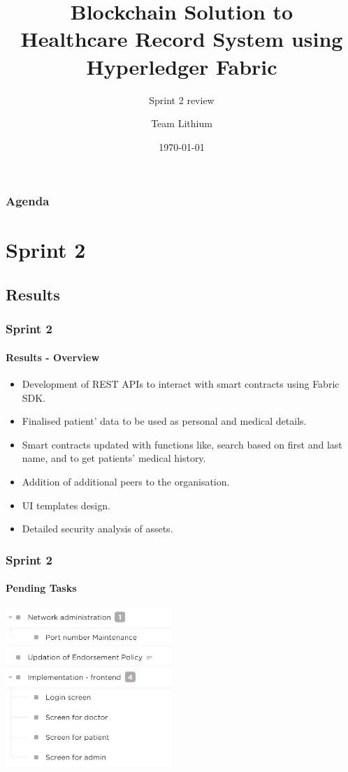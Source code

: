 \documentclass[english,hangout]{beamer}
\title{Blockchain Solution to\\Healthcare Record System using\\Hyperledger Fabric}
\subtitle{Sprint 2 review}
\author{Team Lithium}
\date{\today}%
\begin{document}
\begin{frame}
\titlepage
\end{frame}



\begin{frame}
   \frametitle{Agenda}
   \tableofcontents%
\end{frame}




\section{Sprint 2}

\subsection{Results}

\begin{frame}[fragile]
 \frametitle{Sprint 2}
 \framesubtitle{Results - Overview}
  \begin{itemize}
    \item Development of REST APIs to interact with smart contracts using Fabric SDK.
    \item Finalised patient' data to be used as personal and medical details.
    \item Smart contracts updated with functions like, search based on first and last name, and to get patients' medical history.
    \item Addition of additional peers to the organisation.
    \item UI templates design.
    \item Detailed security analysis of assets.
  \end{itemize}
\end{frame}

\begin{frame}[fragile]
 \frametitle{Sprint 2}
 \framesubtitle{Pending Tasks}
\begin{center}
        \vspace{-1.2em}
            \includegraphics[height=6cm]{pending.JPG}
        \end{center}
\end{frame}
\end{document}
